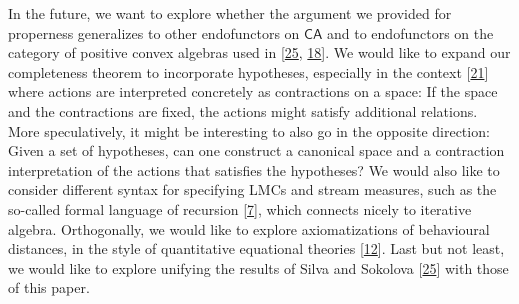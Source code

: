 \documentclass[11pt,a4paper]{amsart}
\begin{document}
\par\medskip
\hypertarget{html:S8.p3}{} In the future, we want to explore whether the argument we provided for properness generalizes to other endofunctors on %
\hypertarget{html:S8.p3.m1}{}\({\mathsf{CA}}\) and to endofunctors on the category of positive convex algebras used in [\hyperlink{html:bib.bib25}{25}, \hyperlink{html:bib.bib18}{18}]. We would like to expand our completeness theorem to incorporate hypotheses, especially in the context [\hyperlink{html:bib.bib21}{21}] where actions are interpreted concretely as contractions on a space: If the space and the contractions are fixed, the actions might satisfy additional relations. More speculatively, it might be interesting to also go in the opposite direction: Given a set of hypotheses, can one construct a canonical space and a contraction interpretation of the actions that satisfies the hypotheses? We would also like to consider different syntax for specifying LMCs and stream measures, such as the so-called formal language of recursion [\hyperlink{html:bib.bib7}{7}], which connects nicely to iterative algebra. Orthogonally, we would like to explore axiomatizations of behavioural distances, in the style of quantitative equational theories [\hyperlink{html:bib.bib12}{12}]. Last but not least, we would like to explore unifying the results of Silva and Sokolova [\hyperlink{html:bib.bib25}{25}] with those of this paper.
\par\medskip
  
\end{document}
